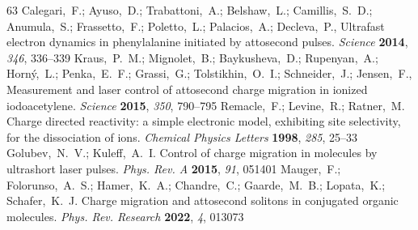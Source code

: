 \documentclass[journal=jacsat,manuscript=article]{achemso}
\begin{document}
\begin{mcitethebibliography}{63}
{\mcitedefaultendpunct}{\mcitedefaultseppunct}\relax
\EndOfBibitem
{}
Calegari,~F.; Ayuso,~D.; Trabattoni,~A.; Belshaw,~L.; Camillis,~S.~D.;
  Anumula,~S.; Frassetto,~F.; Poletto,~L.; Palacios,~A.; Decleva,~P.,
    Ultrafast electron dynamics in phenylalanine initiated by
  attosecond pulses. \emph{Science} \textbf{2014}, \emph{346}, 336--339\relax
\mciteBstWouldAddEndPuncttrue
\mciteSetBstMidEndSepPunct{\mcitedefaultmidpunct}
{\mcitedefaultendpunct}{\mcitedefaultseppunct}\relax
\EndOfBibitem
{}
Kraus,~P.~M.; Mignolet,~B.; Baykusheva,~D.; Rupenyan,~A.; Horn\'{y},~L.;
  Penka,~E.~F.; Grassi,~G.; Tolstikhin,~O.~I.; Schneider,~J.; Jensen,~F.,
    Measurement and laser control of attosecond charge migration
  in ionized iodoacetylene. \emph{Science} \textbf{2015}, \emph{350},
  790--795\relax
\mciteBstWouldAddEndPuncttrue
\mciteSetBstMidEndSepPunct{\mcitedefaultmidpunct}
{\mcitedefaultendpunct}{\mcitedefaultseppunct}\relax
\EndOfBibitem
{}
Remacle,~F.; Levine,~R.; Ratner,~M. Charge directed reactivity: a simple
  electronic model, exhibiting site selectivity, for the dissociation of ions.
  \emph{Chemical Physics Letters} \textbf{1998}, \emph{285}, 25--33\relax
\mciteBstWouldAddEndPuncttrue
\mciteSetBstMidEndSepPunct{\mcitedefaultmidpunct}
{\mcitedefaultendpunct}{\mcitedefaultseppunct}\relax
\EndOfBibitem
{}
Golubev,~N.~V.; Kuleff,~A.~I. Control of charge migration in molecules by
  ultrashort laser pulses. \emph{Phys. Rev. A} \textbf{2015}, \emph{91},
  051401\relax
\mciteBstWouldAddEndPuncttrue
\mciteSetBstMidEndSepPunct{\mcitedefaultmidpunct}
{\mcitedefaultendpunct}{\mcitedefaultseppunct}\relax
\EndOfBibitem
{}
Mauger,~F.; Folorunso,~A.~S.; Hamer,~K.~A.; Chandre,~C.; Gaarde,~M.~B.;
  Lopata,~K.; Schafer,~K.~J. Charge migration and attosecond solitons in
  conjugated organic molecules. \emph{Phys. Rev. Research} \textbf{2022},
  \emph{4}, 013073\relax
\mciteBstWouldAddEndPuncttrue
\mciteSetBstMidEndSepPunct{\mcitedefaultmidpunct}
{\mcitedefaultendpunct}{\mcitedefaultseppunct}\relax

\end{mcitethebibliography}
\end{document}
